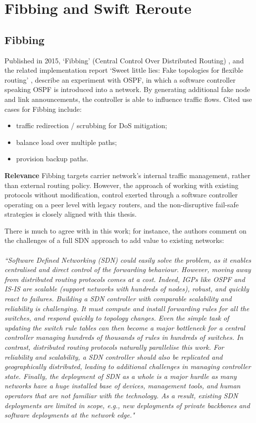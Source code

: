 \section{Fibbing and Swift Reroute}
\subsection{Fibbing}
Published in 2015, `Fibbing' (Central Control Over Distributed Routing) \cite{Vissicchio2015c},
and the related implementation report `Sweet little lies: Fake topologies for flexible routing'  \cite{Vissicchio2014}, describe an experiment with OSPF,
in which a software controller speaking OSPF is introduced into a network.
By generating additional fake node and link announcements, the controller is able to influence traffic flows.
Cited use cases for Fibbing include:
\begin{itemize}[noitemsep,nolistsep]
	\item{traffic redirection / scrubbing for DoS mitigation;}
	\item{balance load over multiple paths;}
	\item{provision backup paths.}
\end{itemize}


\textbf{Relevance}  Fibbing targets carrier network's internal traffic management, rather than external routing policy.
However, the approach of working with existing protocols without modification,
control exerted through a software controller operating on a peer level with legacy routers,
and the non-disruptive fail-safe strategies is closely aligned with this thesis.


There is much to agree with in this work; for instance, the authors comment on the challenges of a full SDN approach to add value to existing networks:
\\
\\
\emph{``Software Defined Networking (SDN) could easily solve the problem, as it enables centralised and direct control of the forwarding behaviour.
However, moving away from distributed routing protocols comes at a cost.
Indeed, IGPs like OSPF and IS-IS are scalable (support networks with hundreds of nodes), robust, and quickly react to failures.
Building a SDN controller with comparable scalability and reliability is challenging.
It must compute and install forwarding rules for all the switches, and respond quickly to topology changes.
Even the simple task of updating the switch rule tables can then become a major bottleneck for a central controller managing hundreds of thousands of rules in hundreds of switches.
In contrast, distributed routing protocols naturally parallelise this work.
For reliability and scalability, a SDN controller should also be replicated and geographically distributed, leading to additional challenges in managing controller state.
Finally, the deployment of SDN as a whole is a major hurdle as many networks have a huge installed base of devices, management tools, and human operators that are not familiar with the technology.
As a result, existing SDN deployments are limited in scope, e.g., new deployments of private backbones and software deployments at the network edge."}

